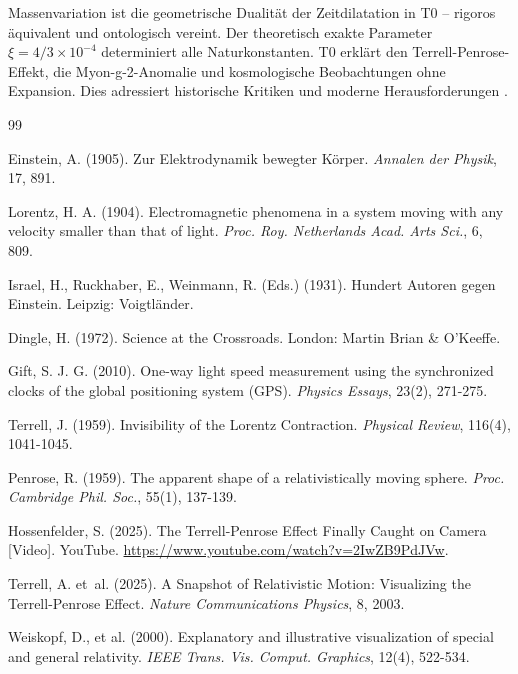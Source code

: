 	Massenvariation ist die geometrische Dualität der Zeitdilatation in T0 – rigoros äquivalent und ontologisch vereint. Der theoretisch exakte Parameter $\xi = 4/3 \times 10^{-4}$ determiniert alle Naturkonstanten. T0 erklärt den Terrell-Penrose-Effekt, die Myon-g-2-Anomalie und kosmologische Beobachtungen ohne Expansion. Dies adressiert historische Kritiken \cite{hundert1931, dingle1972} und moderne Herausforderungen \cite{riess2022, divalentino2021}. 
	

	
	\begin{thebibliography}{99}
		
		Einstein, A. (1905). Zur Elektrodynamik bewegter Körper. \emph{Annalen der Physik}, 17, 891.
		
		Lorentz, H. A. (1904). Electromagnetic phenomena in a system moving with any velocity smaller than that of light. \emph{Proc. Roy. Netherlands Acad. Arts Sci.}, 6, 809.
		
		Israel, H., Ruckhaber, E., Weinmann, R. (Eds.) (1931). Hundert Autoren gegen Einstein. Leipzig: Voigtländer.
		
		Dingle, H. (1972). Science at the Crossroads. London: Martin Brian \& O'Keeffe.
		
		Gift, S. J. G. (2010). One-way light speed measurement using the synchronized clocks of the global positioning system (GPS). \emph{Physics Essays}, 23(2), 271-275.
		
		Terrell, J. (1959). Invisibility of the Lorentz Contraction. \emph{Physical Review}, 116(4), 1041-1045.
		
		Penrose, R. (1959). The apparent shape of a relativistically moving sphere. \emph{Proc. Cambridge Phil. Soc.}, 55(1), 137-139.
		
		Hossenfelder, S. (2025). The Terrell-Penrose Effect Finally Caught on Camera [Video]. YouTube. \url{https://www.youtube.com/watch?v=2IwZB9PdJVw}.
		
		Terrell, A. et~al. (2025). A Snapshot of Relativistic Motion: Visualizing the Terrell-Penrose Effect. \emph{Nature Communications Physics}, 8, 2003.
		
		Weiskopf, D., et al. (2000). Explanatory and illustrative visualization of special and general relativity. \emph{IEEE Trans. Vis. Comput. Graphics}, 12(4), 522-534.
		

\end{thebibliography}
